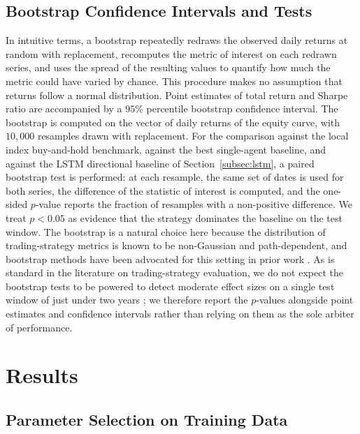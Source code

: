 \documentclass{ieeeaccess}
\begin{document}
\subsection{Bootstrap Confidence Intervals and Tests}
\label{subsec:bootstrap}

In intuitive terms, a bootstrap repeatedly redraws the observed daily returns at random with replacement, recomputes the metric of interest on each redrawn series, and uses the spread of the resulting values to quantify how much the metric could have varied by chance. This procedure makes no assumption that returns follow a normal distribution. Point estimates of total return and Sharpe ratio are accompanied by a $95\%$ percentile bootstrap confidence interval. The bootstrap is computed on the vector of daily returns of the equity curve, with $10{,}000$ resamples drawn with replacement. For the comparison against the local index buy-and-hold benchmark, against the best single-agent baseline, and against the LSTM directional baseline of Section~\ref{subsec:lstm}, a paired bootstrap test is performed: at each resample, the same set of dates is used for both series, the difference of the statistic of interest is computed, and the one-sided $p$-value reports the fraction of resamples with a non-positive difference. We treat $p < 0.05$ as evidence that the strategy dominates the baseline on the test window. The bootstrap is a natural choice here because the distribution of trading-strategy metrics is known to be non-Gaussian and path-dependent, and bootstrap methods have been advocated for this setting in prior work \cite{politis1994}. As is standard in the literature on trading-strategy evaluation, we do not expect the bootstrap tests to be powered to detect moderate effect sizes on a single test window of just under two years \cite{bailey2014}; we therefore report the $p$-values alongside point estimates and confidence intervals rather than relying on them as the sole arbiter of performance.

\section{Results}
\label{sec:results}

\subsection{Parameter Selection on Training Data}
\end{document}
